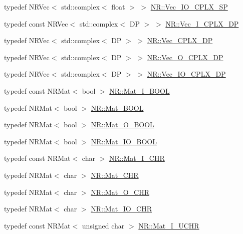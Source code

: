 \begin{DoxyCompactItemize}
\item 
typedef N\+R\+Vec$<$ std\+::complex$<$ float $>$ $>$ \mbox{\hyperlink{namespaceNR_ae2d1431f9f152dfdbf891d3d131cf309}{N\+R\+::\+Vec\+\_\+\+I\+O\+\_\+\+C\+P\+L\+X\+\_\+\+SP}}
\item 
typedef const N\+R\+Vec$<$ std\+::complex$<$ DP $>$ $>$ \mbox{\hyperlink{namespaceNR_ad1b14bf0517c78cb2e0c1407b08ba92b}{N\+R\+::\+Vec\+\_\+\+I\+\_\+\+C\+P\+L\+X\+\_\+\+DP}}
\item 
typedef N\+R\+Vec$<$ std\+::complex$<$ DP $>$ $>$ \mbox{\hyperlink{namespaceNR_a536dbe7aa725634b172a6c366a0a3e4f}{N\+R\+::\+Vec\+\_\+\+C\+P\+L\+X\+\_\+\+DP}}
\item 
typedef N\+R\+Vec$<$ std\+::complex$<$ DP $>$ $>$ \mbox{\hyperlink{namespaceNR_ace78d6fd6a189eda11ef1f1ec73692d9}{N\+R\+::\+Vec\+\_\+\+O\+\_\+\+C\+P\+L\+X\+\_\+\+DP}}
\item 
typedef N\+R\+Vec$<$ std\+::complex$<$ DP $>$ $>$ \mbox{\hyperlink{namespaceNR_a5f15a34fe35c8311d00b61d4483a203e}{N\+R\+::\+Vec\+\_\+\+I\+O\+\_\+\+C\+P\+L\+X\+\_\+\+DP}}
\item 
typedef const N\+R\+Mat$<$ bool $>$ \mbox{\hyperlink{namespaceNR_a466d5c0bd034b0d6de59d8933b425b09}{N\+R\+::\+Mat\+\_\+\+I\+\_\+\+B\+O\+OL}}
\item 
typedef N\+R\+Mat$<$ bool $>$ \mbox{\hyperlink{namespaceNR_a59411c0161320f28563d72f97b88ad69}{N\+R\+::\+Mat\+\_\+\+B\+O\+OL}}
\item 
typedef N\+R\+Mat$<$ bool $>$ \mbox{\hyperlink{namespaceNR_af6c2362243608fcb5bf9c0d347209d80}{N\+R\+::\+Mat\+\_\+\+O\+\_\+\+B\+O\+OL}}
\item 
typedef N\+R\+Mat$<$ bool $>$ \mbox{\hyperlink{namespaceNR_a82a88d1a8eaf0a352f9dc5d5976253c4}{N\+R\+::\+Mat\+\_\+\+I\+O\+\_\+\+B\+O\+OL}}
\item 
typedef const N\+R\+Mat$<$ char $>$ \mbox{\hyperlink{namespaceNR_aee0811ffb93cf889082b088ab2e4b37f}{N\+R\+::\+Mat\+\_\+\+I\+\_\+\+C\+HR}}
\item 
typedef N\+R\+Mat$<$ char $>$ \mbox{\hyperlink{namespaceNR_ad2f728fc5ba81ae9f08834b7d9efcb1d}{N\+R\+::\+Mat\+\_\+\+C\+HR}}
\item 
typedef N\+R\+Mat$<$ char $>$ \mbox{\hyperlink{namespaceNR_a018b6abc03718b84730383f05f4dba29}{N\+R\+::\+Mat\+\_\+\+O\+\_\+\+C\+HR}}
\item 
typedef N\+R\+Mat$<$ char $>$ \mbox{\hyperlink{namespaceNR_aebd44b690f4f5f165100ac3d68c3405f}{N\+R\+::\+Mat\+\_\+\+I\+O\+\_\+\+C\+HR}}
\item 
typedef const N\+R\+Mat$<$ unsigned char $>$ \mbox{\hyperlink{namespaceNR_a0c5678809943e339bc2b0c0b57420a15}{N\+R\+::\+Mat\+\_\+\+I\+\_\+\+U\+C\+HR}}

\end{DoxyCompactItemize}
